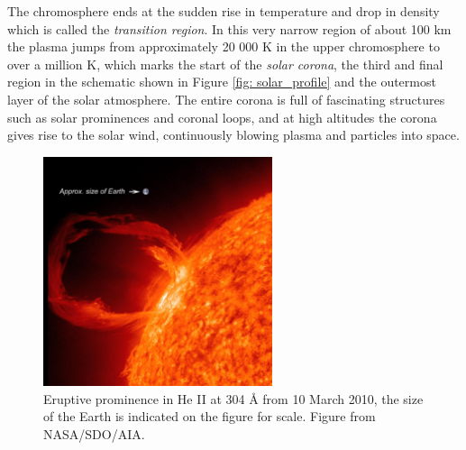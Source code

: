 The chromosphere ends at the sudden rise in temperature and drop in density which is called the
\emph{transition region}. In this very narrow region of about 100 km the plasma jumps from approximately 20 000 K in the upper chromosphere to over a million K, which marks the start of the \emph{solar corona}, the third and final region in the schematic shown in Figure \ref{fig: solar_profile} and the outermost layer of the solar atmosphere. The entire corona is full of fascinating structures such as solar prominences and coronal loops, and at high altitudes the corona gives rise to the solar wind, continuously blowing plasma and particles into space.

\begin{figure}[t]
  \centering
  \includegraphics[width=0.6\textwidth]{solar_prominence.png}
  \caption{
    Eruptive prominence in He II at 304 {\AA} from 10 March 2010, the size of the Earth is indicated on the figure for scale. Figure from NASA/SDO/AIA.
  }
  \label{fig: solar_prominence}
\end{figure}

